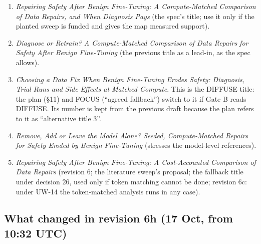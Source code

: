 \documentclass{article}
\theoremstyle{plain}
\theoremstyle{definition}
\theoremstyle{remark}
\begin{document}
\begin{enumerate}
  \item \emph{Repairing Safety After Benign Fine-Tuning: A Compute-Matched
        Comparison of Data Repairs, and When Diagnosis Pays} (the spec's title;
        use it only if the planted sweep is funded and gives the map measured
        support).
  \item \emph{Diagnose or Retrain? A Compute-Matched Comparison of Data Repairs
        for Safety After Benign Fine-Tuning} (the previous title as a lead-in,
        as the spec allows).
  \item \emph{Choosing a Data Fix When Benign Fine-Tuning Erodes Safety:
        Diagnosis, Trial Runs and Side Effects at Matched Compute}. This is the
        DIFFUSE title: the plan (\S{}11) and FOCUS (``agreed fallback'') switch
        to it if Gate B reads DIFFUSE. Its number is kept from the previous
        draft because the plan refers to it as ``alternative title 3''.
  \item \emph{Remove, Add or Leave the Model Alone? Seeded, Compute-Matched
        Repairs for Safety Eroded by Benign Fine-Tuning} (stresses the
        model-level references).
  \item \emph{Repairing Safety After Benign Fine-Tuning: A Cost-Accounted
        Comparison of Data Repairs} (revision 6; the literature sweep's
        proposal; the fallback title under decision 26, used only if token
        matching cannot be done; revision 6c: under UW-14 the token-matched
        analysis runs in any case).
\end{enumerate}

\subsection{What changed in revision 6h (17 Oct, from 10:32 UTC)}
\end{document}
